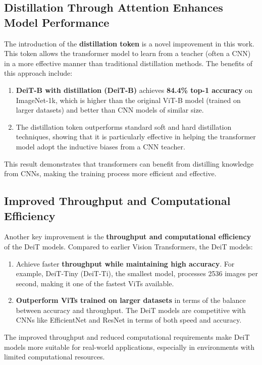 \documentclass{report}
\begin{document}
	\subsection{Distillation Through Attention Enhances Model Performance}
	The introduction of the \textbf{distillation token} is a novel improvement in this work. This token allows the transformer model to learn from a teacher (often a CNN) in a more effective manner than traditional distillation methods. The benefits of this approach include:
	\begin{enumerate}
		\item 
		\textbf{DeiT-B with distillation (DeiT-B)} achieves \textbf{84.4\% top-1 accuracy} on ImageNet-1k, which is higher than the original ViT-B model (trained on larger datasets) and better than CNN models of similar size.
		
		\item 
		The distillation token outperforms standard soft and hard distillation techniques, showing that it is particularly effective in helping the transformer model adopt the inductive biases from a CNN teacher.
	\end{enumerate}
	This result demonstrates that transformers can benefit from distilling knowledge from CNNs, making the training process more efficient and effective.
	
	
	
	\subsection{Improved Throughput and Computational Efficiency}
	Another key improvement is the \textbf{throughput and computational efficiency} of the DeiT models. Compared to earlier Vision Transformers, the DeiT models:
	
	\begin{enumerate}
		\item 
		Achieve faster \textbf{throughput while maintaining high accuracy}. For example, DeiT-Tiny (DeiT-Ti), the smallest model, processes 2536 images per second, making it one of the fastest ViTs available.
		
		\item 
		\textbf{Outperform ViTs trained on larger datasets} in terms of the balance between accuracy and throughput. The DeiT models are competitive with CNNs like EfficientNet and ResNet in terms of both speed and accuracy.
	\end{enumerate}
	The improved throughput and reduced computational requirements make DeiT models more suitable for real-world applications, especially in environments with limited computational resources.
	
\end{document}
